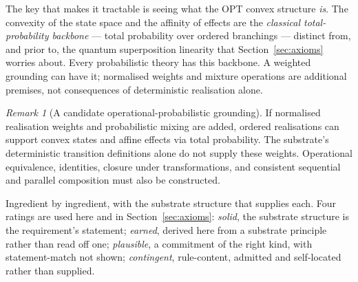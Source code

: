 \documentclass[11pt,a4paper]{article}
\theoremstyle{remark}\newtheorem{remark}[definition]{Remark}
\begin{document}
The key that makes it tractable is seeing what the OPT convex structure
\emph{is}. The convexity of the state space and the affinity of effects are the
\emph{classical total-probability backbone} --- total probability over ordered
branchings --- distinct from, and prior to, the quantum superposition linearity
that Section~\ref{sec:axioms} worries about. Every probabilistic theory has this
backbone. A weighted grounding can have it; normalised weights and mixture operations are additional premises, not consequences of deterministic realisation alone.

\begin{remark}[A candidate operational-probabilistic grounding]\label{prop:opt}
If normalised realisation weights and probabilistic mixing are added, ordered
realisations can support convex states and affine effects via total probability.
The substrate's deterministic transition definitions alone do not supply these
weights. Operational equivalence, identities, closure under transformations,
and consistent sequential and parallel composition must also be constructed.
\end{remark}

Ingredient by ingredient, with the substrate structure that supplies each. Four
ratings are used here and in Section~\ref{sec:axioms}: \emph{solid}, the substrate
structure is the requirement's statement; \emph{earned}, derived here from a
substrate principle rather than read off one; \emph{plausible}, a commitment of the
right kind, with statement-match not shown; \emph{contingent}, rule-content, admitted
and self-located rather than supplied.
\end{document}
